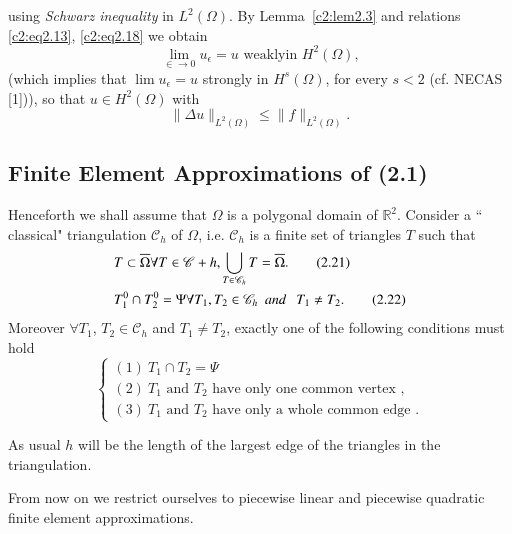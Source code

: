 using \textit{Schwarz inequality} in $L^2(\Omega)$. By Lemma~\ref{c2:lem2.3} and
relations \eqref{c2:eq2.13}, \eqref{c2:eq2.18} we obtain 
\begin{equation}
\lim\limits_{\in \to 0} u_\epsilon = u \text{ weaklyin }H^2
(\Omega), \tag{2.19}\label{c2:eq2.19}  
\end{equation} 
(which implies that $\lim u_\epsilon =u$ strongly in $H^s(\Omega)$,
for every $s < 2$ (cf. NECAS [1])), so that $u \in H^2(\Omega)$
with  
\begin{equation}
\parallel \Delta u \parallel_{L^2 (\Omega)} \leq \parallel  f \parallel_{L^2 (\Omega)}. 
\tag{2.20}\label{c2:eq2.20} 
\end{equation}

\subsection{Finite Element Approximations of
  (2.1)}\label{c2:ss2.5}%

Henceforth we shall assume that $\Omega$ is a polygonal domain of
$\mathbb{R}^2$. Consider a `` classical" triangulation $\mathscr{C}_h $ of
$\Omega$, i.e. $\mathscr{C}_h$ is a finite set of triangles $T$ such that  
\begin{align}
&T \subset \overline{\Omega} \forall T \in \mathscr{C}+h, \bigcup_{T
\in \mathscr{C}_h} T = \overline{\Omega}.\tag{2.21}\label{c2:eq2.21}\\ 
&T^{0}_1 \cap T^{0}_2 = \Psi \forall T_1, T_2 \in \mathscr{C}_h
~~\text{\em and } ~~T_1 \neq T_2.\tag{2.22}\label{c2:eq2.22} 
\end{align}
Moreover $\forall T_1$, $T_2 \in  \mathscr{C}_h$ and $T_1 \neq T_2$,
exactly one of the following conditions must hold  
\begin{equation}
\begin{cases}
(1) ~T_1 \cap T_2 = \Psi\\
(2) ~T_1 \text{ and } T_2 \text{ have only one common vertex },\\
(3)~T_1 \text{ and } T_2 \text{ have only a whole common edge }.
\end{cases}\tag{2.23}\label{c2:eq2.23}
\end{equation}\pageoriginale 
 
 As usual $h$ will be the length of the largest edge of the triangles
 in the triangulation. 
 
 From now on we restrict ourselves to piecewise linear and piecewise
 quadratic finite element approximations. 
 
